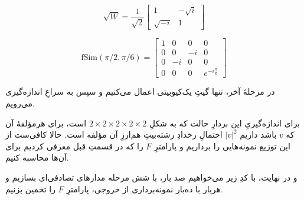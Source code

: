 \documentclass[11pt]{article}
\begin{document}
\[ \sqrt{W} = \frac{1}{\sqrt{2}} \begin{bmatrix} 1 & - \sqrt{i} \\ \sqrt{-i} & 1 \end{bmatrix} \]

\[ \text{fSim}(\pi/2, \pi/6) = \begin{bmatrix} 
1 & 0 & 0 & 0 \\
0 & 0 & -i & 0 \\
0 & -i & 0 & 0 \\
0 & 0 & 0 & e^{-i\frac{\pi}{6}} \end{bmatrix} \]

در مرحلهٔ آخر، تنها گیتِ یک‌کیوبیتی اعمال می‌کنیم و سپس به سراغِ اندازه‌گیری می‌رویم.

برای اندازه‌گیریِ این بردارِ حالت که به شکلِ 
$2\times 2\times 2\times 2\times 2$
است، برای هرمؤلفهٔ آن که $v$ باشد داریم 
$|v|^2$
احتمالِ رخدادِ رشته‌بیتِ هم‌ارزِ آن مؤلفه است. حالا کافی‌ست از این توزیع نمونه‌هایی را برداریم و پارامترِ $F$ را که در قسمتِ قبل معرفی کردیم برای آن‌ها محاسبه کنیم.

و در نهایت، با کدِ زیر می‌خواهیم صد بار،  با شش مرحله مدارهای تصادفی‌ای بسازیم و هربار با ده‌بار نمونه‌برداری از خروجی، پارامترِ $F$ را تخمین بزنیم.
\end{document}
